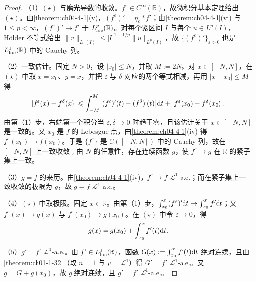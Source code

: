 ﻿\documentclass[../../main.tex]{subfiles}%
\begin{document}
\begin{proof}
（1）$(\star)$ 与磨光导数的收敛。$f^{\varepsilon}\in C^{\infty}(\mathbb{R})$，故微积分基本定理给出 $(\star)$。由\cref{theorem:ch04-4-1}(v)，$(f^{\varepsilon})'=\eta_{\varepsilon}*f'$；由\cref{theorem:ch04-4-1}(vi) 与 $1\leqslant p<\infty$，$(f^{\varepsilon})'\to f'$ 于 $L^{p}_{\mathrm{loc}}(\mathbb{R})$。对每个紧区间 $I$ 与每个 $u\in L^{p}(I)$，Hölder 不等式给出 $\lVert u\rVert_{L^{1}(I)}\leqslant\lvert I\rvert^{1-1/p}\lVert u\rVert_{L^{p}(I)}$，故 $\{(f^{\varepsilon})'\}_{\varepsilon>0}$ 也是 $L^{1}_{\mathrm{loc}}(\mathbb{R})$ 中的 Cauchy 列。%

（2）一致估计。固定 $N>0$，设 $\lvert x_{0}\rvert\leqslant N$，并取 $M:=2N$。对 $x\in[-N,N]$，在 $(\star)$ 中取 $x=x_{0}$、$y=x$，并把 $\varepsilon$ 与 $\delta$ 对应的两个等式相减，再用 $\lvert x-x_{0}\rvert\leqslant M$ 得
\begin{align*}
\lvert f^{\varepsilon}(x)-f^{\delta}(x)\rvert\leqslant\int_{-M}^{M}\bigl\lvert(f^{\varepsilon})'(t)-(f^{\delta})'(t)\bigr\rvert\mathrm{d} t+\lvert f^{\varepsilon}(x_{0})-f^{\delta}(x_{0})\rvert .
\end{align*}
由第（1）步，右端第一个积分当 $\varepsilon,\delta\to0$ 时趋于零，且该估计关于 $x\in[-N,N]$ 是一致的。又 $x_{0}$ 是 $f$ 的 Lebesgue 点，由\cref{theorem:ch04-4-1}(iv) 得 $f^{\varepsilon}(x_{0})\to f(x_{0})$。于是 $\{f^{\varepsilon}\}$ 是 $C([-N,N])$ 中的 Cauchy 列，故在 $[-N,N]$ 上一致收敛；由 $N$ 的任意性，存在连续函数 $g$，使 $f^{\varepsilon}\to g$ 在 $\mathbb{R}$ 的紧子集上一致。%

（3）$g=f$ 的来历。由\cref{theorem:ch04-4-1}(iv)，$f^{\varepsilon}\to f$ $\mathcal{L}^{1}$-a.e.；而在紧子集上一致收敛的极限为 $g$，故 $g=f$ $\mathcal{L}^{1}$-a.e.。%

（4）$(\star)$ 中取极限。固定 $x\in\mathbb{R}$。由第（1）步，$\int_{x_{0}}^{x}(f^{\varepsilon})'\mathrm{d} t\to\int_{x_{0}}^{x}f'\mathrm{d} t$；又 $f^{\varepsilon}(x)\to g(x)$ 与 $f^{\varepsilon}(x_{0})\to g(x_{0})$。在 $(\star)$ 中令 $\varepsilon\to0$，得
\begin{align*}
g(x)=g(x_{0})+\int_{x_{0}}^{x}f'(t)\mathrm{d} t .
\end{align*}

（5）$g'=f'$ $\mathcal{L}^{1}$-a.e.。由 $f'\in L^{1}_{\mathrm{loc}}(\mathbb{R})$，函数 $G(x):=\int_{x_{0}}^{x}f'(t)\mathrm{d} t$ 绝对连续，且由\cref{theorem:ch01-1-32}（取 $n=1$ 与 $\mu=\mathcal{L}^{1}$）得 $G'=f'$ $\mathcal{L}^{1}$-a.e.。又 $g=G+g(x_{0})$，故 $g$ 绝对连续，且 $g'=f'$ $\mathcal{L}^{1}$-a.e.。%


\end{proof}
\end{document}
